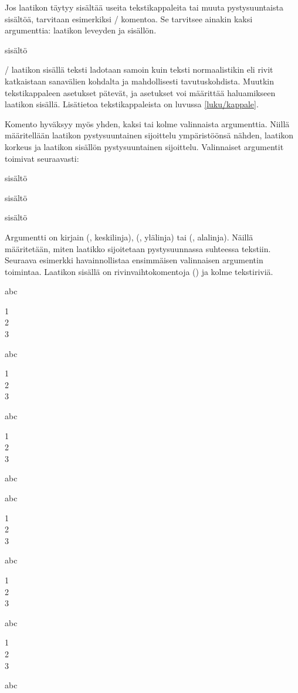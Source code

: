 Jos laatikon täytyy sisältää useita tekstikappaleita tai muuta
pystysuuntaista sisältöä, tarvitaan esimerkiksi \-/
komentoa. Se tarvitsee ainakin kaksi argumenttia: laatikon leveyden ja
sisällön.

\begin{koodilohkosis}
\parbox{leveys}{sisältö}
\end{koodilohkosis}

\noindent
{}\-/ laatikon sisällä teksti ladotaan samoin kuin teksti
normaalistikin eli rivit katkaistaan sanavälien kohdalta ja
mahdollisesti tavutuskohdista. Muutkin tekstikappaleen asetukset
pätevät, ja asetukset voi määrittää haluamikseen laatikon sisällä.
Lisätietoa tekstikappaleista on luvussa \ref{luku/kappale}.

Komento  hyväksyy myös yhden, kaksi tai kolme
valinnaista argumenttia. Niillä määritellään laatikon pystysuuntainen
sijoittelu ympäristöönsä nähden, laatikon korkeus ja laatikon sisällön
pystysuuntainen sijoittelu. Valinnaiset argumentit toimivat seuraavasti:

\begin{koodilohkosis}
\parbox[sijainti]{leveys}{sisältö}
\parbox[sijainti][korkeus]{leveys}{sisältö}
\parbox[sijainti][korkeus][sisäsijainti]{leveys}{sisältö}
\end{koodilohkosis}

\noindent
Argumentti  on kirjain  (,
keskilinja),  (, ylälinja) tai 
(, alalinja). Näillä määritetään, miten laatikko
sijoitetaan pystysuunnassa suhteessa tekstiin. Seuraava esimerkki
havainnollistaa ensimmäisen valinnaisen argumentin toimintaa. Laatikon
sisällä on rivinvaihtokomentoja (\komento{\keno}) ja kolme tekstiriviä.

\begin{koodilohkosis}
abc \parbox[c]{1em}{1 \\ 2 \\ 3}
abc \parbox[t]{1em}{1 \\ 2 \\ 3}
abc \parbox[b]{1em}{1 \\ 2 \\ 3} abc
\end{koodilohkosis}

\begin{tulossis}
  abc \parbox[c]{1em}{1 \\ 2 \\ 3}
  abc \parbox[t]{1em}{1 \\ 2 \\ 3}
  abc \parbox[b]{1em}{1 \\ 2 \\ 3} abc
\end{tulossis}

